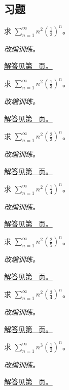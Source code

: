 \documentclass[UTF8,12pt,a4paper,fontset=fandol]{ctexart}
\begin{document}
\subsection{习题}
\begin{example}[平方系数的几何和]\label{ex:c27q1}
求 $\displaystyle\sum_{n=1}^\infty n^2(\frac{1}{2})^n$。
\par\textit{改编训练。}\par\hyperref[ans:c27q1]{解答见第~\pageref{ans:c27q1} 页。}
\end{example}
\begin{example}[平方系数的几何和]\label{ex:c27q2}
求 $\displaystyle\sum_{n=1}^\infty n^2(\frac{1}{3})^n$。
\par\textit{改编训练。}\par\hyperref[ans:c27q2]{解答见第~\pageref{ans:c27q2} 页。}
\end{example}
\begin{example}[平方系数的几何和]\label{ex:c27q3}
求 $\displaystyle\sum_{n=1}^\infty n^2(\frac{2}{3})^n$。
\par\textit{改编训练。}\par\hyperref[ans:c27q3]{解答见第~\pageref{ans:c27q3} 页。}
\end{example}
\begin{example}[平方系数的几何和]\label{ex:c27q4}
求 $\displaystyle\sum_{n=1}^\infty n^2(\frac{1}{4})^n$。
\par\textit{改编训练。}\par\hyperref[ans:c27q4]{解答见第~\pageref{ans:c27q4} 页。}
\end{example}
\begin{example}[平方系数的几何和]\label{ex:c27q5}
求 $\displaystyle\sum_{n=1}^\infty n^2(\frac{2}{5})^n$。
\par\textit{改编训练。}\par\hyperref[ans:c27q5]{解答见第~\pageref{ans:c27q5} 页。}
\end{example}
\begin{example}[平方系数的几何和]\label{ex:c27q6}
求 $\displaystyle\sum_{n=1}^\infty n^2(\frac{3}{4})^n$。
\par\textit{改编训练。}\par\hyperref[ans:c27q6]{解答见第~\pageref{ans:c27q6} 页。}
\end{example}
\begin{example}[立方系数的几何和]\label{ex:c27q7}
求 $\displaystyle\sum_{n=1}^\infty n^3(\frac{1}{2})^n$。
\par\textit{改编训练。}\par\hyperref[ans:c27q7]{解答见第~\pageref{ans:c27q7} 页。}
\end{example}
\end{document}

